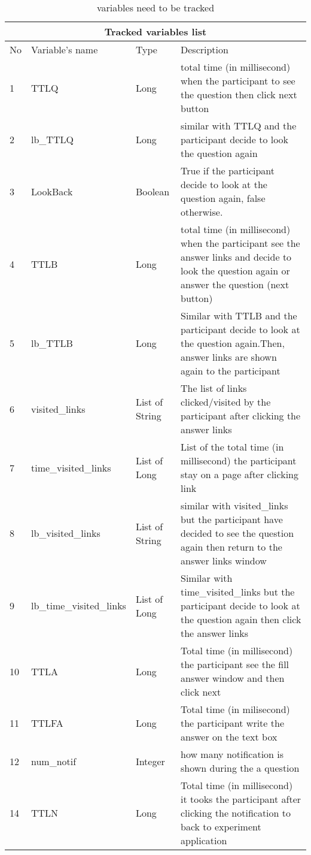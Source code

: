 \begin{table}
  \centering
\begin{longtable}{ |p{0.5cm}|p{4cm}|p{2.3cm}|p{6cm}|  }
 \hline
 \multicolumn{4}{|c|}{Tracked variables list} \\
 \hline
 No& Variable's name & Type & Description \\
 \hline
 1 & TTLQ & Long  & total time (in millisecond) when the participant to see the question then click next button\\
 2 & lb\_TTLQ & Long & similar with TTLQ and the participant decide to look the question again\\
 3 & LookBack & Boolean & True if the participant decide to look at the question again, false otherwise. \\
 4 & TTLB & Long & total time (in millisecond) when the participant see the answer links and decide to look the question again or answer the question (next button) \\
 5 & lb\_TTLB & Long & Similar with TTLB and the participant decide to look at the question again.Then, answer links are shown again to the participant\\
 6 & visited\_links & List of String & The list of links clicked/visited by the participant after clicking the answer links\\
 7 & time\_visited\_links & List of Long  & List of the total time (in millisecond) the participant stay on a page after clicking link\\
 8 & lb\_visited\_links & List of String & similar with visited\_links but the participant have decided to see the question again then return to the answer links window\\
 9 & lb\_time\_visited\_links & List of Long & Similar with time\_visited\_links but the participant decide to look at the question again then click the answer links\\
 10 & TTLA & Long & Total time (in millisecond) the participant see the fill answer window and then click next\\
 11 & TTLFA & Long & Total time (in milisecond) the participant write the answer on the text box\\
 12 &  num\_notif & Integer & how many notification is shown during the a question \\
 14 & TTLN & Long & Total time (in millisecond) it tooks the participant after clicking the notification to back to experiment application\\
\hline
\end{longtable}
\caption{variables need to be tracked}
 \label{tab:trackedVarible}
\end{table}
\par
